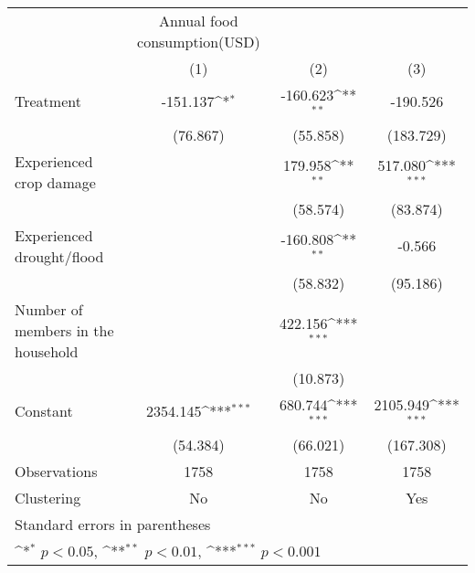 {
\def\sym#1{\ifmmode^{#1}\else\(^{#1}\)\fi}
\begin{tabular}{l*{3}{c}}
\hline\hline
                    &Annual food consumption(USD)                                     \\
                    &\multicolumn{1}{c}{(1)}         &\multicolumn{1}{c}{(2)}         &\multicolumn{1}{c}{(3)}         \\
\hline
Treatment           &    -151.137\sym{*}  &    -160.623\sym{**} &    -190.526         \\
                    &    (76.867)         &    (55.858)         &   (183.729)         \\
[1em]
Experienced crop damage&                     &     179.958\sym{**} &     517.080\sym{***}\\
                    &                     &    (58.574)         &    (83.874)         \\
[1em]
Experienced drought/flood&                     &    -160.808\sym{**} &      -0.566         \\
                    &                     &    (58.832)         &    (95.186)         \\
[1em]
Number of members in the household&                     &     422.156\sym{***}&                     \\
                    &                     &    (10.873)         &                     \\
[1em]
Constant            &    2354.145\sym{***}&     680.744\sym{***}&    2105.949\sym{***}\\
                    &    (54.384)         &    (66.021)         &   (167.308)         \\
\hline
Observations        &        1758         &        1758         &        1758         \\
Clustering          &          No         &          No         &         Yes         \\
\hline\hline
\multicolumn{4}{l}{\footnotesize Standard errors in parentheses}\\
\multicolumn{4}{l}{\footnotesize \sym{*} \(p<0.05\), \sym{**} \(p<0.01\), \sym{***} \(p<0.001\)}\\
\end{tabular}
}

